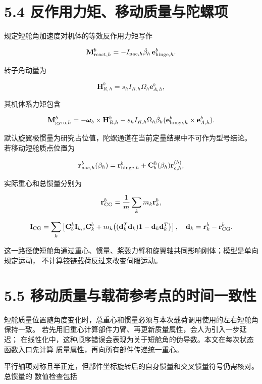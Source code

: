 \documentclass[UTF8,11pt,oneside,openany,fontset=windows]{ctexbook}
\begin{document}
\section{5.4
反作用力矩、移动质量与陀螺项}\label{ux53cdux4f5cux7528ux529bux77e9ux79fbux52a8ux8d28ux91cfux4e0eux9640ux87baux9879}

规定短舱角加速度对机体的等效反作用力矩写作

\[
\mathbf M_{{\rm react},h}^b=-I_{{\rm nac},h}\ddot\beta_h\,\mathbf e_{{\rm hinge},h}^b.
\]

转子角动量为

\[
\mathbf H_{R,h}^b=s_h I_{R,h}\Omega_h\mathbf e_{A,h}^b,
\]

其机体系力矩包含

\[
\mathbf M_{{\rm gyro},h}^b=
-\boldsymbol\omega_b\times\mathbf H_{R,h}^b
-s_hI_{R,h}\Omega_h\dot\beta_h
(\mathbf e_{{\rm hinge},h}^b\times\mathbf e_{A,h}^b).
\]

默认旋翼极惯量为研究占位值，陀螺通道在当前定量结果中不可作为型号结论。
若移动短舱质点位置为

\[
\mathbf r_{{\rm nac},h}^b(\beta_h)=
\mathbf r_{{\rm hinge},h}^b+\mathbf C_b^h(\beta_h)\mathbf r_{c,h}^{(h)},
\]

实际重心和总惯量分别为

\[
\mathbf r_{\rm CG}^b=\frac{1}{m}\sum_km_k\mathbf r_k^b,
\]

\[
\mathbf I_{\rm CG}=\sum_k\left[
\mathbf C_b^k\mathbf I_{k,c}\mathbf C_k^b
+m_k\big((\mathbf d_k^T\mathbf d_k)\mathbf 1-\mathbf d_k\mathbf d_k^T\big)
\right],
\quad \mathbf d_k=\mathbf r_k^b-\mathbf r_{\rm CG}^b.
\]

这一路径使短舱角通过重心、惯量、桨毂力臂和旋翼轴共同影响刚体；模型是单向规定运动，
不计算铰链载荷反过来改变伺服运动。

\section{5.5
移动质量与载荷参考点的时间一致性}\label{ux79fbux52a8ux8d28ux91cfux4e0eux8f7dux8377ux53c2ux8003ux70b9ux7684ux65f6ux95f4ux4e00ux81f4ux6027}

短舱质量位置随角度变化时，总重心和惯量必须与本次载荷调用使用的左右短舱角保持一致。
若先用旧重心计算部件力臂、再更新质量属性，会人为引入一步延迟；
在线性化中，这种顺序错误会表现为关于短舱角的伪导数。本文在每次状态函数入口先计算
质量属性，再向所有部件传递统一重心。

平行轴项对称且半正定，但部件坐标旋转后的自身惯量和交叉惯量符号仍需核对。总惯量的
数值检查包括
\end{document}
